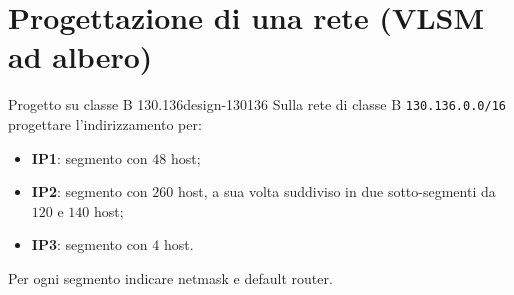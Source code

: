 \documentclass{report}
\begin{document}
\section{Progettazione di una rete (VLSM ad albero)}

\begin{Exercise}{Progetto su classe B 130.136}{design-130136}
Sulla rete di classe B \texttt{130.136.0.0/16} progettare l'indirizzamento per:
\begin{itemize}
\item \textbf{IP1}: segmento con $48$ host;
\item \textbf{IP2}: segmento con $260$ host, a sua volta suddiviso in due
sotto-segmenti da $120$ e $140$ host;
\item \textbf{IP3}: segmento con $4$ host.
\end{itemize}
Per ogni segmento indicare netmask e default router.
\end{Exercise}
\end{document}
